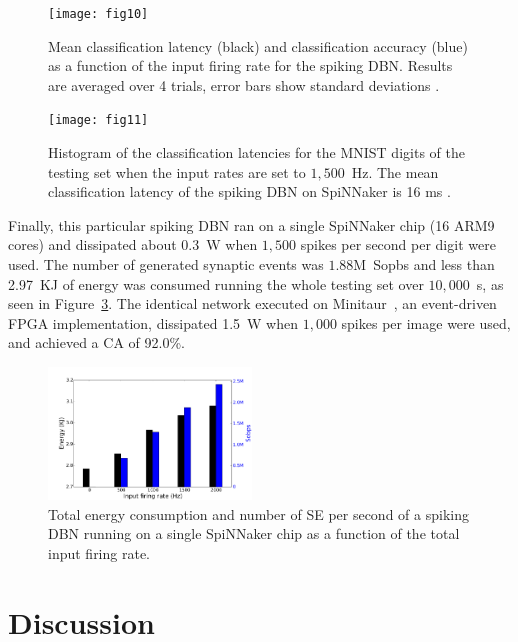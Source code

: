 \documentclass{frontiersENG} %
\begin{document}
\begin{figure}[hbt!]
	\centering
	\texttt{[image: fig10]}
	\caption{Mean classification latency (black) and classification accuracy (blue) as a function of the input firing rate for the spiking DBN. Results are averaged over 4 trials, error bars show standard deviations \citep{Stromatias2015scalable}.}
	\label{Fig:brianLatency}
\end{figure} 



\begin{figure}[hbt!]
	\centering
	\texttt{[image: fig11]}
	\caption{Histogram of the classification latencies for the MNIST digits of the testing set when the input rates are set to $1,500$~Hz. The mean classification latency of the spiking DBN on SpiNNaker is 16 ms \citep{Stromatias2015scalable}.}
	\label{Fig:spinnLatency1500hz}
\end{figure} 

Finally, this particular spiking DBN ran on a single SpiNNaker chip (16 ARM9 cores) and dissipated about 0.3~W when $1,500$ spikes per second per digit were used.
The number of generated synaptic events was $1.88$M~Sopbs and less than 2.97~KJ of energy was consumed running the whole testing set over $10,000$~s, as seen in Figure~\ref{Fig:spinnchipPower}. The identical network executed on Minitaur~\citep{neil2014minitaur}, an event-driven FPGA implementation, dissipated 1.5~W when $1,000$ spikes per image were used, and achieved a CA of 92.0\%.

\begin{figure}[hbt!]
	\centering
	\includegraphics[width=0.48\textwidth]{fig12_m}
	\caption{
	Total energy consumption and number of SE per second of a spiking DBN running on a single SpiNNaker chip as a function of the total input firing rate.}
	\label{Fig:spinnchipPower}
\end{figure} 

\section{Discussion}
\label{sec:summ}
\end{document}
